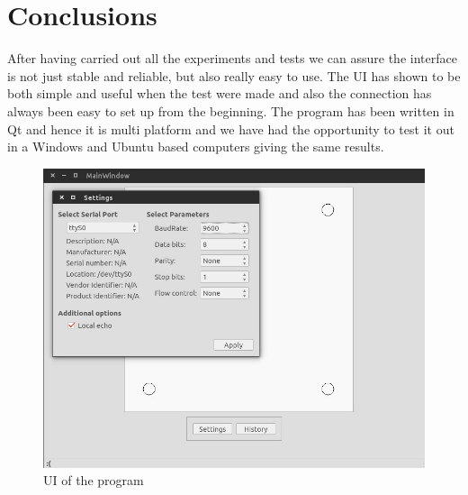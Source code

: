 	\section{Conclusions} %
	\label{sec:high_level_programming_conclusions}
		After having carried out all the experiments and tests we can assure the interface is not just stable and reliable, but also really easy to use.
		The UI has shown to be both simple and useful when the test were made and also the connection has always been easy to set up from the beginning.
		The program has been written in Qt and hence it is multi platform and we have had the opportunity to test it out in a Windows and Ubuntu based computers giving the same results.
		\begin{figure}[htb]
			\begin{center}
				\includegraphics[width=.8\textwidth]{figures/UI}
			\end{center}
			\caption{UI of the program}
			\label{fig:ui}
		\end{figure}
